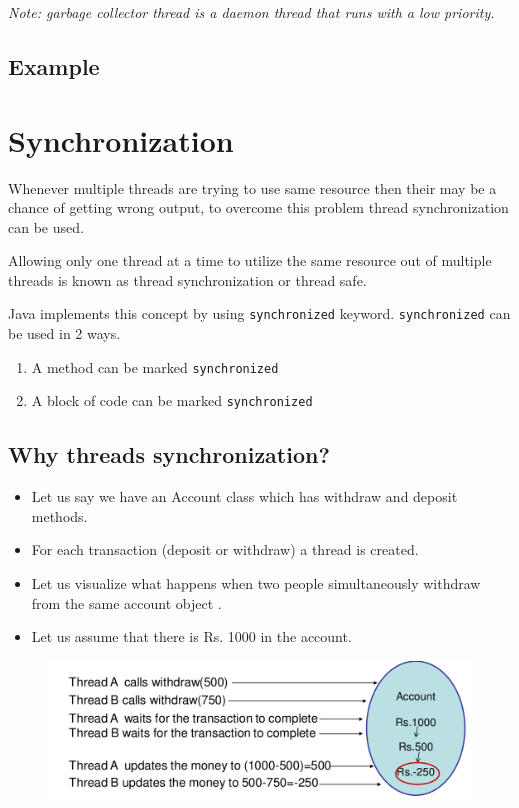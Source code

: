 \documentclass[11pt,a4paper]{article}
\begin{document}
\emph{Note: garbage collector thread is a daemon thread that runs with a low priority.}
\subsection*{Example}


\section*{Synchronization}
Whenever multiple threads are trying to use same resource then their may be a chance of getting wrong output, to overcome this problem thread synchronization can be used.

Allowing only one thread at a time to utilize the same resource out of multiple threads is known as thread synchronization or thread safe.

Java implements this concept by using \texttt{synchronized} keyword. \texttt{synchronized} can be used in 2 ways.
\begin{enumerate}
\item A method can be marked \texttt{synchronized}
\item A block of code can be marked \texttt{synchronized}
\end{enumerate}
\subsection*{Why threads synchronization?}
\begin{itemize}
\item Let us say we have an Account class which has withdraw and deposit methods.
\item For each transaction (deposit or withdraw) a thread is created.
\item Let us visualize what happens when two people simultaneously withdraw from the same account object .
\item Let us assume that there is Rs. 1000 in the account.
\end{itemize}

\begin{figure}[ht]
\begin{center}
\includegraphics[scale=0.26]{WhySynchronization.png}
\end{center}
\end{figure}
\end{document}
